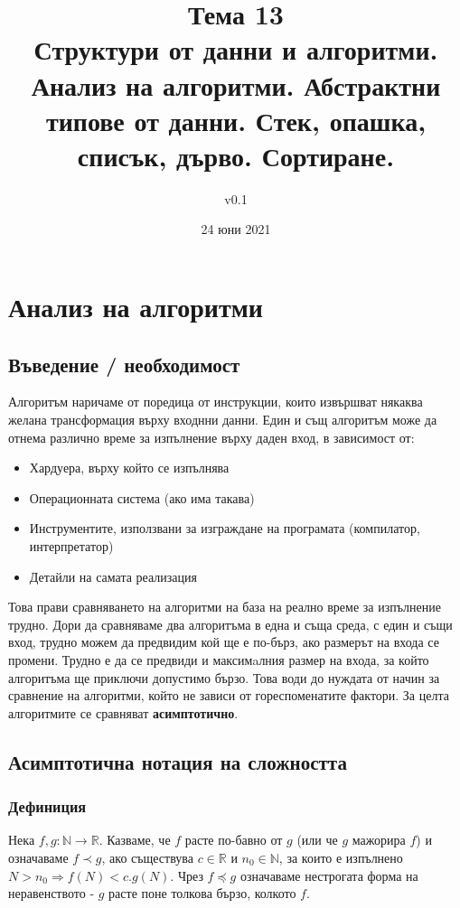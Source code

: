 \documentclass[fleqn,12pt]{article}
\title{Тема 13\\ Структури от данни и алгоритми. Анализ на алгоритми. Абстрактни
типове от данни. Стек, опашка, списък, дърво. Сортиране.}
\author{v0.1}
\date{24 юни 2021}
\begin{document}
\maketitle

\tableofcontents

\section{Анализ на алгоритми}
\subsection{Въведение / необходимост}
Алгоритъм наричаме от поредица от инструкции, които извършват някаква желана трансформация върху входнни данни.
Един и същ алгоритъм може да отнема различно време за изпълнение върху даден вход, в зависимост от:
\begin{itemize}
    \item Хардуера, върху който се изпълнява
    \item Операционната система (ако има такава)
    \item Инструментите, използвани за изграждане на програмата (компилатор, интерпретатор)
    \item Детайли на самата реализация
\end{itemize}

Това прави сравняването на алгоритми на база на реално време за изпълнение трудно. Дори да сравняваме два алгоритъма
в една и съща среда, с един и същи вход, трудно можем да предвидим кой ще е по-бърз, ако размерът на входа се промени.
Трудно е да се предвиди и максимaлния размер на входа, за който алгоритъма ще приключи допустимо бързо.
Това води до нуждата от начин за сравнение на алгоритми, който не зависи от гореспоменатите фактори. За целта 
алгоритмите се сравняват \textbf{асимптотично}.

\subsection{Асимптотична нотация на сложността}
\subsubsection{Дефиниция}
Нека $f, g : \mathbb{N} \rightarrow \mathbb{R}$. Казваме, че $f$ расте по-бавно от $g$ (или че $g$ мажорира $f$) и означаваме $f \prec g$, ако 
съществува $c \in \mathbb{R}$ и $n_0 \in \mathbb{N}$, за които е изпълнено $N > n_0 \Rightarrow f(N) < c.g(N)$.
Чрез $f \preceq g$ означаваме нестрогата форма на неравенството - $g$ расте поне толкова бързо, колкото $f$.
\end{document}
